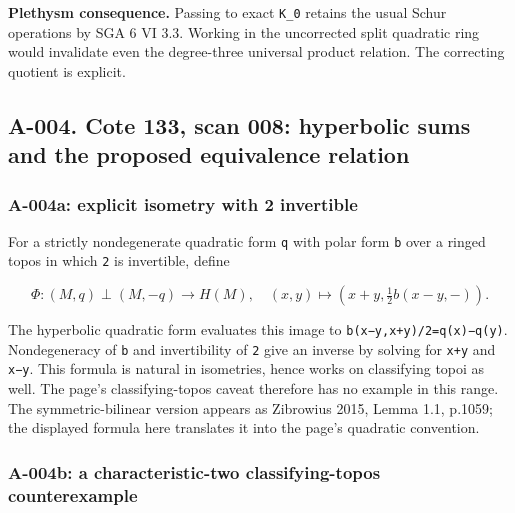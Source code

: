 \documentclass[
  10pt,
]{article}
\begin{document}
\textbf{Plethysm consequence.} Passing to exact
\texttt{\small K\_\allowbreak{}0} retains the usual Schur operations by
SGA 6 VI 3.3. Working in the uncorrected split quadratic ring would
invalidate even the degree-three universal product relation. The
correcting quotient is explicit.

\subsection{A-004. Cote 133, scan 008: hyperbolic sums and the proposed
equivalence
relation}\label{a-004.-cote-133-scan-008-hyperbolic-sums-and-the-proposed-equivalence-relation}

\subsubsection{A-004a: explicit isometry with 2
invertible}\label{a-004a-explicit-isometry-with-2-invertible}

For a strictly nondegenerate quadratic form \texttt{\small q} with polar
form \texttt{\small b} over a ringed topos in which \texttt{\small 2} is
invertible, define

\[
\Phi:(M,q)\perp(M,-q)\longrightarrow H(M),
\quad (x,y)\longmapsto(x+y,\tfrac12 b(x-y,-)).
\]

The hyperbolic quadratic form evaluates this image to
\texttt{\small b(\allowbreak{}x−y,\allowbreak{}x+\allowbreak{}y)\allowbreak{}/\allowbreak{}2=\allowbreak{}q(\allowbreak{}x)\allowbreak{}−q(\allowbreak{}y)\allowbreak{}}.
Nondegeneracy of \texttt{\small b} and invertibility of
\texttt{\small 2} give an inverse by solving for
\texttt{\small x+\allowbreak{}y} and \texttt{\small x−y}. This formula
is natural in isometries, hence works on classifying topoi as well. The
page's classifying-topos caveat therefore has no example in this range.
The symmetric-bilinear version appears as Zibrowius 2015, Lemma 1.1,
p.1059; the displayed formula here translates it into the page's
quadratic convention.

\subsubsection{A-004b: a characteristic-two classifying-topos
counterexample}\label{a-004b-a-characteristic-two-classifying-topos-counterexample}
\end{document}
